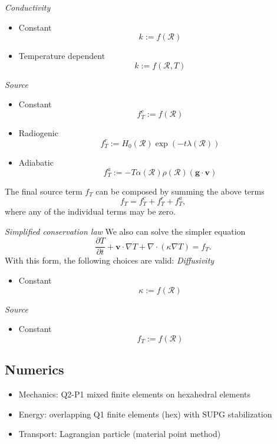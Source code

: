\documentclass[paper=a4, fontsize=10pt,twoside]{scrartcl}
\begin{document}
\textit{Conductivity}
\begin{itemize}
\item Constant
$$
	k := f(\mathcal R)
$$
\item Temperature dependent
$$
	k := f(\mathcal R,T)
$$
\end{itemize}

\textit{Source}
\begin{itemize}
\item Constant
$$
	f_T^c := f(\mathcal R)
$$
\item Radiogenic
$$
	f_T^r := H_0(\mathcal R) \exp( -t \lambda(\mathcal R) )
$$
\item Adiabatic
$$
	f_T^a := - T \alpha(\mathcal R) \rho(\mathcal R) (\boldsymbol g \cdot \boldsymbol v)
$$
\end{itemize}
The final source term $f_T$ can be composed by summing the above terms
$$
	f_T = f_T^c + f_T^r + f_T^a,
$$
where any of the individual terms may be zero.\vspace{10mm}

\textit{Simplified conservation law}\newline
We also can solve the simpler equation
$$
\frac{\partial T}{\partial t} + \boldsymbol v \cdot \nabla T + \nabla \cdot \left( \kappa \nabla T\right) =  f_T.
$$
With this form, the following choices are valid:\newline
\textit{Diffusivity}
\begin{itemize}
\item Constant
$$
	\kappa := f(\mathcal R)
$$
\end{itemize}
\textit{Source}
\begin{itemize}
\item Constant
$$
	f_T := f(\mathcal R)
$$
\end{itemize}


\subsection{Numerics}
\begin{itemize}
\item Mechanics: Q2-P1 mixed finite elements on hexahedral elements
\item Energy: overlapping Q1 finite elements (hex) with SUPG stabilization
\item Transport: Lagrangian particle (material point method)
\end{itemize}

\end{document}
